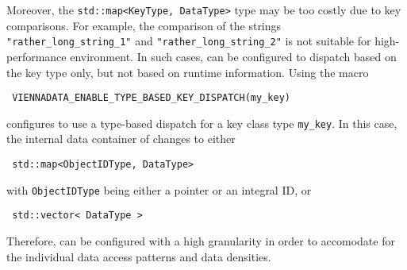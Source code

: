 Moreover, the \lstinline|std::map<KeyType, DataType>| type may be too costly due to key comparisons. For example, the comparison of the strings \lstinline|"rather_long_string_1"| and \lstinline|"rather_long_string_2"| is not suitable for high-performance environment. In such cases, {\ViennaData}
can be configured to dispatch based on the key type only, but not based on runtime information. Using the macro
\begin{lstlisting}
 VIENNADATA_ENABLE_TYPE_BASED_KEY_DISPATCH(my_key)
\end{lstlisting}
configures {\ViennaData} to use a type-based dispatch for a key class type \lstinline|my_key|. In this case, the internal data container of {\ViennaData}
changes to either
\begin{lstlisting}
 std::map<ObjectIDType, DataType>
\end{lstlisting}
with \lstinline|ObjectIDType| being either a pointer or an integral ID, or
\begin{lstlisting}
 std::vector< DataType >
\end{lstlisting}
Therefore, {\ViennaData} can be configured with a high granularity in order to accomodate for the individual data access patterns and data densities.

